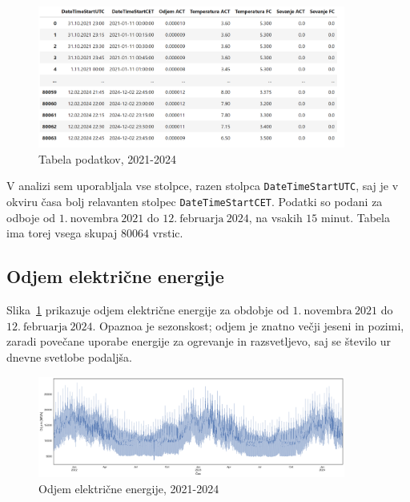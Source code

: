 \documentclass[a4paper, 11pt]{article}
\begin{document}
\begin{figure}[h!]
    \centering
    \caption{Tabela podatkov, 2021-2024}\par\medskip
    \includegraphics[width=0.9\textwidth]{tabela.png}
\end{figure}

\noindent V analizi sem uporabljala vse stolpce, razen stolpca \texttt{DateTimeStartUTC}, saj je v 
okviru časa bolj relavanten stolpec \texttt{DateTimeStartCET}. Podatki so podani za odboje od $1.~\text{novembra}~2021$ do $12.~\text{februarja}~2024$,
na vsakih $15$ minut. Tabela ima torej vsega skupaj $80064$ vrstic.


\subsection{Odjem električne energije}

\noindent Slika~\ref{fig:odjem_EE} prikazuje odjem električne energije za obdobje od 
$1.~\text{novembra}~2021$ do $12.~\text{februarja}~2024$. 
Opaznoa je sezonskost; odjem je znatno večji jeseni in pozimi, zaradi povečane uporabe energije za ogrevanje in 
razsvetljevo, saj se število ur dnevne svetlobe podaljša. 

\begin{figure}[h!]
    \centering
    \caption{Odjem električne energije, 2021-2024}\par\medskip
    \label{fig:odjem_EE}
    \includegraphics[width=0.9\textwidth]{odjem_EE.png}
\end{figure}
\end{document}
